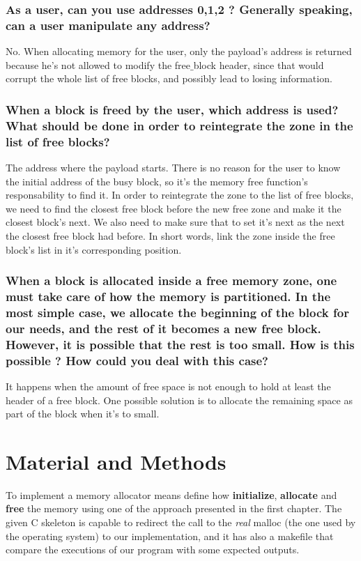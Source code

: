 \documentclass[11pt]{article}
\begin{document}
\subsubsection*{As a user, can you use addresses 0,1,2 ? Generally speaking, can a user manipulate any address?}
No. When allocating memory for the user, only the payload's address is returned because he's not allowed to modify  the free$\_$block header, since that would corrupt the whole list of free blocks, and possibly lead to losing information.

\subsubsection*{When a block is freed by the user, which address is used? What should be done in order to reintegrate the zone in the list of free blocks?}
The address where the payload starts. There is no reason for the user to know the initial address of the busy block, so it's the memory free function's responsability to find it. 
In order to reintegrate the zone to the list of free blocks, we need to find the closest free block before the new free zone and make it the closest block's next. We also need to make sure that to set it's next as the next the closest free block had before. In short words, link the zone inside the free block's list in it's corresponding position.

\subsubsection*{When a block is allocated inside a free memory zone, one must take care of how the memory is partitioned. In the most simple case, we allocate the beginning of the block for our needs, and the rest of it becomes a new free block. However, it is possible that the rest is too small. How is this possible ? How could you deal with this case?}
It happens when the amount of free space is not enough to hold at least the header of a free block. One possible solution is to allocate the remaining space as part of the block when it's to small.

\section{Material and Methods}

To implement a memory allocator means define how \textbf{initialize}, \textbf{allocate} and \textbf{free} the memory using one of the approach presented in the first chapter. The given C skeleton is capable to redirect the call to the \textit{real} malloc (the one used by the operating system) to our implementation, and it has also a makefile that compare the executions of our program with some expected outputs.
 
\end{document}
